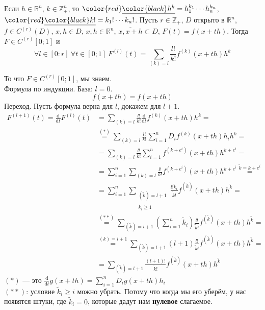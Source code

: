 \documentclass{article}
\begin{document}
\begin{itemize}
\begin{Comment}
        \end{Comment}
        \dfn Если $h\in\mathbb R^n$, $k\in\mathbb Z^n_+$, то ${\color{red}\underline{{\color{black}h^k}}}=h_1^{k_1}\cdots h_n^{k_n}$, ${\color{red}\underline{{\color{black}k!}}}=k_1!\cdots k_n!$.
        \thm Пусть $r\in\mathbb Z_+$, $D$ открыто в $\mathbb R^n$, $f\in C^{(r)}(D)$, $x,h\in D$, $x,h\in\mathbb R^n$, $\overline{x,x+h}\subset D$, $F(t)=f(x+th)$. Тогда
        $F\in C^{(r)}[0;1]$ и
        $$\forall l\in[0:r]~\forall t\in[0;1]~F^{(l)}(t)=\sum\limits_{(k)=l}\frac{l!}{k!}f^{(k)}(x+th)h^k$$
        \begin{Proof}
            То что $F\in C^{(r)}[0;1]$, мы знаем.\\
            Формула по индукции. База: $l=0$.
            $$
            f(x+th)=f(x+th)
            $$
            Переход. Пусть формула верна для $l$, докажем для $l+1$.
            \[\begin{split}
                F^{(l+1)}(t)=\frac{\mathrm d}{\mathrm dt}F^{(l)}(t)&=\sum\limits_{(k)=l}\frac{l!}{k!}\frac{\mathrm d}{\mathrm dt}f^{(k)}(x+th)h^k=\\
                &\overset{(*)}=\sum\limits_{(k)=l}\frac{l!}{k!}\sum\limits_{i=1}^nD_if^{(k)}(x+th)h_ih^k=\\
                &=\sum\limits_{(k)=l}\frac{l!}{k!}\sum\limits_{i=1}^nf^{(k+e^i)}(x+th)h^{k+e^i}=\\
                &=\sum\limits_{i=1}^n\sum\limits_{(k)=l}\frac{l!}{k!}f^{(k+e^i)}(x+th)h^{k+e^i}\overset{\tilde k=k+e^i}=\\
                &=\sum\limits_{i=1}^n\sum\limits_{\substack{(\tilde{k})=l+1\\\tilde{k_i}\geqslant1}}\frac{l!\tilde k_i}{\tilde k!}f^{(\tilde k)}(x+th)h^{\tilde k}=\\
                &\overset{(**)}=\sum\limits_{(\tilde{k})=l+1}\left(\sum\limits_{i=1}^n\tilde k_i\right)\frac{l!}{\tilde k!}f^{(\tilde k)}(x+th)h^{\tilde k}=\\
                &\overset{(k)=l+1}=\sum\limits_{(\tilde{k})=l+1}(l+1)\frac{l!}{\tilde k!}f^{(\tilde k)}(x+th)h^{\tilde k}=\\
                &=\sum\limits_{(\tilde{k})=l+1}\frac{(l+1)!}{\tilde k!}f^{(\tilde k)}(x+th)h^{\tilde k}
            \end{split}\]
            $(*)$ --- это $\frac{\mathrm d}{\mathrm dt}g(x+th)=\sum\limits_{i=1}^nD_ig(x+th)h_i$\\
            $(**)$: условие $\tilde k_i\geqslant i$ можно убрать. Потому что когда мы его уберём, у нас появятся штуки, где $\tilde k_i=0$, которые дадут нам \textbf{нулевое} слагаемое.

\end{Proof}
\end{itemize}
\end{document}
